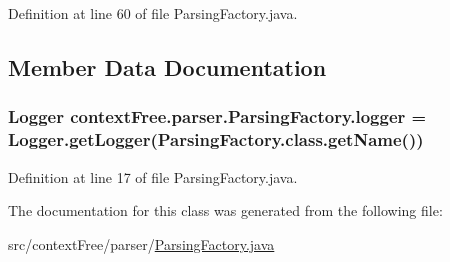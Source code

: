 Definition at line 60 of file Parsing\-Factory.\-java.



\subsection{Member Data Documentation}
\hypertarget{classcontext_free_1_1parser_1_1_parsing_factory_ac398af48e8f8b3d4cce4c8f7c532b09b}{
\subsubsection[{logger}]{\setlength{\rightskip}{0pt plus 5cm}Logger {\bf context\-Free.\-parser.\-Parsing\-Factory.\-logger} = Logger.\-get\-Logger(Parsing\-Factory.\-class.\-get\-Name())}}\label{classcontext_free_1_1parser_1_1_parsing_factory_ac398af48e8f8b3d4cce4c8f7c532b09b}


Definition at line 17 of file Parsing\-Factory.\-java.



The documentation for this class was generated from the following file\-:\begin{DoxyCompactItemize}
\item 
src/context\-Free/parser/\hyperlink{_parsing_factory_8java}{Parsing\-Factory.\-java}\end{DoxyCompactItemize}
